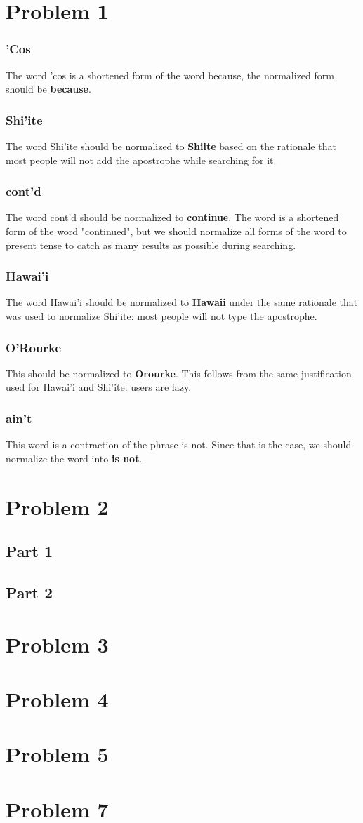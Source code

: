 \documentclass{article}%
\begin{document}
\section*{Problem 1}
\subsubsection*{'Cos}
The word 'cos is a shortened form of the word because, the normalized form should be \textbf{because}.
\subsubsection*{Shi'ite}
The word Shi'ite should be normalized to \textbf{Shiite} based on the rationale that most people will not add the apostrophe while searching for it.
\subsubsection*{cont'd}
The word cont'd should be normalized to \textbf{continue}. The word is a shortened form of the word "continued", but we should normalize all forms of the word to present tense to catch as many results as possible during searching.
\subsubsection*{Hawai'i}
The word Hawai'i should be normalized to \textbf{Hawaii} under the same rationale that was used to normalize Shi'ite: most people will not type the apostrophe.
\subsubsection*{O'Rourke}
This should be normalized to \textbf{Orourke}. This follows from the same justification used for Hawai'i and Shi'ite: users are lazy.
\subsubsection*{ain't}
This word is a contraction of the phrase is not. Since that is the case, we should normalize the word into \textbf{is not}.
\section*{Problem 2}
\subsection*{Part 1}
\subsection*{Part 2}
\section*{Problem 3}
\section*{Problem 4}
\section*{Problem 5}
\section*{Problem 7}
\end{document}
